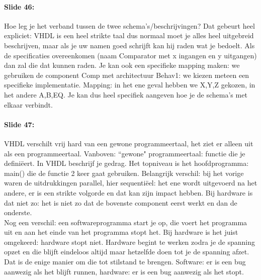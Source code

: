 \documentclass[10pt,a4paper]{book}
\begin{document}
\paragraph{Slide 46:} Hoe leg je het verband tussen de twee schema's/beschrijvingen? Dat gebeurt heel expliciet: VHDL is een heel strikte taal dus normaal moet je alles heel uitgebreid beschrijven, maar als je uw namen goed schrijft kan hij raden wat je bedoelt. Als de specificaties overeenkomen (naam Comparator met x ingangen en y uitgangen) dan zal die dat kunnen raden. Je kan ook een specifieke mapping maken: we gebruiken de component Comp met architectuur Behav1: we kiezen meteen een specifieke implementatie. Mapping: in het ene geval hebben we X,Y,Z gekozen, in het andere A,B,EQ. Je kan dus heel specifiek aangeven hoe je de schema's met elkaar verbindt.

\paragraph{Slide 47:} VHDL verschilt vrij hard van een gewone programmeertaal, het ziet er alleen uit als een programmeertaal. Vanboven: ``gewone" programmeertaal: functie die je defini\"eert. In VHDL beschrijf je gedrag. Het topniveau is het hoofdprogramma: main() die de functie 2 keer gaat gebruiken. Belangrijk verschil: bij het vorige waren de uitdrukkingen parallel, hier sequenti\"eel: het ene wordt uitgevoerd na het andere, er is een strikte volgorde en dat kan zijn impact hebben. Bij hardware is dat niet zo: het is niet zo dat de bovenste component eerst werkt en dan de onderste. \\
Nog een verschil: een softwareprogramma start je op, die voert het programma uit en aan het einde van het programma stopt het. Bij hardware is het juist omgekeerd: hardware stopt niet. Hardware begint te werken zodra je de spanning opzet en die blijft eindeloos altijd maar hetzelfde doen tot je de spanning afzet. Dat is de enige manier om die tot stilstand te brengen. Software: er is een bug aanwezig als het blijft runnen, hardware: er is een bug aanwezig als het stopt.
\end{document}
